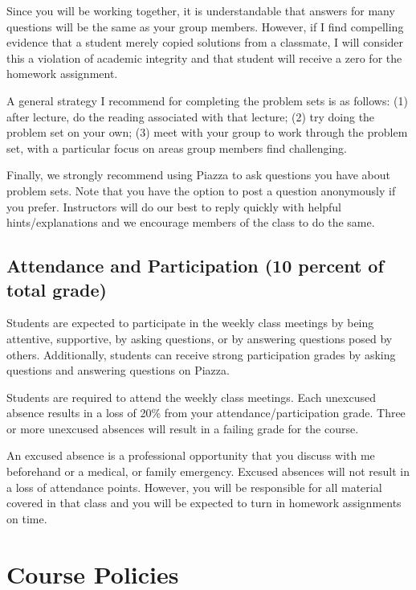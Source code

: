 \documentclass[11pt,]{article}
\begin{document}
Since you will be working together, it is understandable that answers
for many questions will be the same as your group members. However, if I
find compelling evidence that a student merely copied solutions from a
classmate, I will consider this a violation of academic integrity and
that student will receive a zero for the homework assignment.

A general strategy I recommend for completing the problem sets is as
follows: (1) after lecture, do the reading associated with that lecture;
(2) try doing the problem set on your own; (3) meet with your group to
work through the problem set, with a particular focus on areas group
members find challenging.

Finally, we strongly recommend using Piazza to ask questions you have
about problem sets. Note that you have the option to post a question
anonymously if you prefer. Instructors will do our best to reply quickly
with helpful hints/explanations and we encourage members of the class to
do the same.

\hypertarget{attendance-and-participation-10-percent-of-total-grade}{%
\subsection{Attendance and Participation (10 percent of total
grade)}\label{attendance-and-participation-10-percent-of-total-grade}}

Students are expected to participate in the weekly class meetings by
being attentive, supportive, by asking questions, or by answering
questions posed by others. Additionally, students can receive strong
participation grades by asking questions and answering questions on
Piazza.

Students are required to attend the weekly class meetings. Each
unexcused absence results in a loss of 20\% from your
attendance/participation grade. Three or more unexcused absences will
result in a failing grade for the course.

An excused absence is a professional opportunity that you discuss with
me beforehand or a medical, or family emergency. Excused absences will
not result in a loss of attendance points. However, you will be
responsible for all material covered in that class and you will be
expected to turn in homework assignments on time.

\hypertarget{course-policies}{%
\section{Course Policies}\label{course-policies}}
\end{document}

